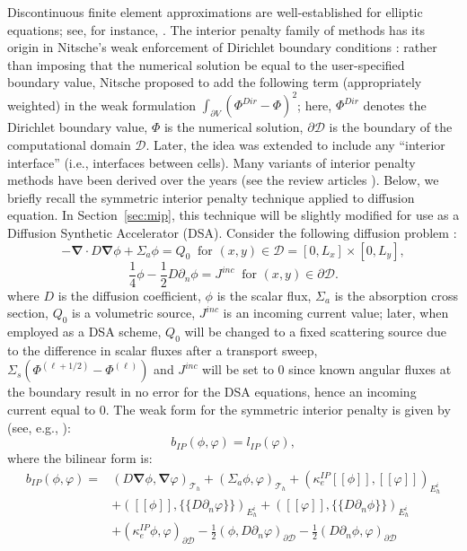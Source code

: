 \documentclass{mc2013}
\newcommand\bn{\boldsymbol{\nabla}}
\newcommand{\jmp}[1]{[\![#1]\!]}                     %
\newcommand{\mvl}[1]{\{\!\!\{#1\}\!\!\}}             %
\newcommand\tf{\varphi}
\newcommand\mc{\mathcal}
\renewcommand{\(}{\left(}
\renewcommand{\)}{\right)}
\renewcommand{\[}{\left[}
\renewcommand{\]}{\right]}
\begin{document}
Discontinuous finite element approximations are well-established for elliptic equations; see, for
instance, \cite{Kanschat2007}. The interior penalty family of methods has its origin in Nitsche's weak enforcement
of Dirichlet boundary conditions \cite{nitsche}: rather than imposing that the numerical solution be equal to the
user-specified boundary value, Nitsche proposed to add the following term (appropriately weighted) 
in the weak formulation $\int_{\partial V} (\Phi^{Dir}-\Phi)^2$; 
here, $\Phi^{Dir}$ denotes the Dirichlet boundary value, $\Phi$ is the numerical 
solution, $\partial \mc{D}$ is the boundary of the computational domain $\mc{D}$. Later, the idea was extended to
include any ``interior interface'' (i.e., interfaces between cells). Many variants of interior penalty methods have
been derived over the years (see the review articles \cite{Kanschat2007,ip-review}). Below, we briefly
recall the symmetric interior penalty technique applied to diffusion equation. In Section~\ref{sec:mip},
this technique will be slightly modified for use as a Diffusion Synthetic Accelerator (DSA).
%
%
Consider the following diffusion problem :
\begin{equation}
  -\bn \cdot D \bn \phi + \Sigma_a \phi = Q_0\ \textrm{ for } (x,y) \in \mc{D}=[0,L_x]\times[0,L_y],
\end{equation}
\begin{equation}
\frac{1}{4}\phi - \frac{1}{2} D \partial_n \phi = J^{inc}\ \textrm{ for } (x,y) \in \partial \mc{D}.
\end{equation}
%
where $D$ is the diffusion coefficient, $\phi$ is the scalar flux, $\Sigma_a$
is the absorption cross section, $Q_0$ is a volumetric source, $J^{inc}$ is an
incoming current value; later, when employed as a DSA scheme, $Q_0$  will be changed to a fixed scattering source due to 
the difference in scalar fluxes after a transport sweep, $\Sigma_s (\Phi^{(\ell+1/2)}-\Phi^{(\ell)})$ and $J^{inc}$
will be set to 0 since known angular fluxes at the boundary result in no error for the DSA equations, hence an incoming current equal to 0. The weak form for the symmetric interior penalty is given by (see, e.g., \cite{Kanschat2007}):
\begin{equation}
\label{eq:ip-form}
  b_{IP}(\phi,\tf) = l_{IP}(\tf),
\end{equation}
where the bilinear form is:
\begin{equation}
\label{eq:matrix-ip-form}
  \begin{split}
    b_{IP} (\phi,\tf) =& \(D\bn\phi,\bn \tf\)_{\mc{T}_h} + \(\Sigma_a \phi,\tf\)_{\mc{T}_h}  +
    (\kappa_e^{IP}\jmp{\phi},\jmp{\tf})_{E_h^i}\\
    &+ \( \jmp{\phi}, \mvl{D\partial_n \tf}\)_{E_h^i}
     + \( \jmp{\tf}, \mvl{D\partial_n \phi}\)_{E_h^i} \\
    &+ \( \kappa_e^{IP} \phi, \tf \)_{\partial \mc{D}}
    -\frac{1}{2}\(\phi,D\partial_n \tf\)_{\partial \mc{D}}
    -\frac{1}{2}\(D\partial_n\phi,\tf\)_{\partial \mc{D}}
  \end{split}
\end{equation}
\end{document}
